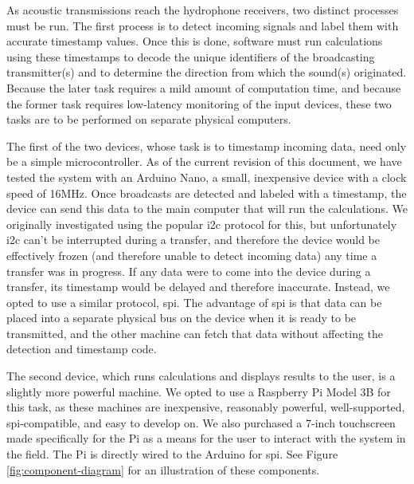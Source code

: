 \documentclass[12pt]{article}
\begin{document}
As acoustic transmissions reach the hydrophone receivers, two distinct
processes must be run.
The first process is to detect incoming signals and label them with accurate
timestamp values.
Once this is done, software must run calculations using these timestamps
to decode the unique identifiers of the broadcasting transmitter(s) and to
determine the direction from which the sound(s) originated.
Because the later task requires a mild amount of computation time,
and because the former task requires low-latency monitoring of the input
devices, these two tasks are to be performed on separate physical computers.

The first of the two devices, whose task is to timestamp incoming data,
need only be a simple microcontroller.
As of the current revision of this document,
we have tested the system with an Arduino Nano, a small,
inexpensive device with a clock speed of 16MHz.
Once broadcasts are detected and labeled with a timestamp, the device can
send this data to the main computer that will run the calculations.
We originally investigated using the popular \gls{i2c} protocol for this, but
unfortunately \gls{i2c} can't be interrupted during a transfer, and therefore
the device would be effectively frozen (and therefore unable to detect
incoming data) any time a transfer was in progress.
If any data were to come into the device during a transfer, its timestamp
would be delayed and therefore inaccurate.
Instead, we opted to use a similar protocol, \gls{spi}.
The advantage of \gls{spi} is that data can be placed into a separate physical
bus on the device when it is ready to be transmitted, and the other machine can
fetch that data without affecting the detection and timestamp code.

The second device, which runs calculations and displays results to the user,
is a slightly more powerful machine.
We opted to use a Raspberry Pi Model 3B for this task, as these machines are
inexpensive, reasonably powerful, well-supported, \gls{spi}-compatible,
and easy to develop on.
We also purchased a 7-inch touchscreen made specifically for the Pi as a means
for the user to interact with the system in the field.
The Pi is directly wired to the Arduino for \gls{spi}.
See Figure \ref{fig:component-diagram} for an illustration of these components.
\end{document}
